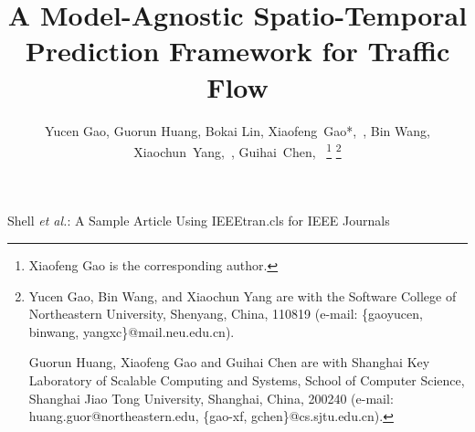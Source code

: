 \documentclass[lettersize,journal]{IEEEtran}
\begin{document}
\title{A Model-Agnostic Spatio-Temporal Prediction Framework for Traffic Flow}

\author{Yucen Gao,
        Guorun Huang,
        Bokai Lin,
        Xiaofeng~Gao*,~, %
        Bin Wang,
        Xiaochun~Yang,~,
        Guihai~Chen,~%
\thanks{Xiaofeng Gao is the corresponding author.}
\thanks{Yucen Gao, Bin Wang, and Xiaochun Yang are with the Software College of Northeastern University, Shenyang, China, 110819 (e-mail: \{gaoyucen, binwang, yangxc\}@mail.neu.edu.cn).

Guorun Huang, Xiaofeng Gao and Guihai Chen are with Shanghai Key Laboratory of Scalable Computing and Systems, School of Computer Science, Shanghai Jiao Tong University, Shanghai, China, 200240 (e-mail: huang.guor@northeastern.edu, \{gao-xf, gchen\}@cs.sjtu.edu.cn).

}
}

%
{Shell \MakeLowercase{\textit{et al.}}: A Sample Article Using IEEEtran.cls for IEEE Journals}


\maketitle
\end{document}

